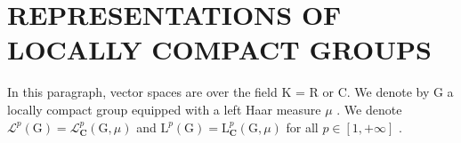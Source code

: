 \section{REPRESENTATIONS OF LOCALLY COMPACT GROUPS}

In this paragraph, vector spaces are over the field K = R or C. We denote by G a locally compact group equipped with a left Haar measure \(\mu\) . We denote \(\mathcal{L}^{p}(\mathrm{G}) = \mathcal{L}_{\mathbf{C}}^{p}(\mathrm{G}, \mu)\) and \(\mathrm{L}^{p}(\mathrm{G}) = \mathrm{L}_{\mathbf{C}}^{p}(\mathrm{G}, \mu)\) for all \(p \in [1, +\infty]\) .

